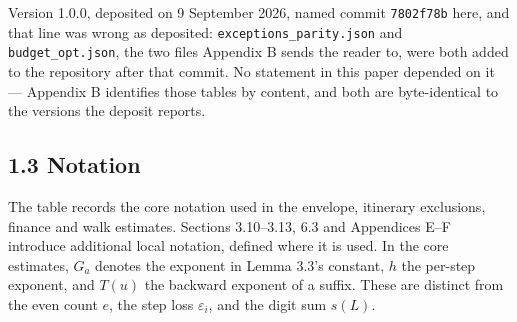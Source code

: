 \documentclass[12pt]{article}
\begin{document}
Version 1.0.0, deposited on 9 September 2026, named commit
\texttt{\nolinkurl{7802f78b}} here, and that line was wrong as
deposited: \texttt{\nolinkurl{exceptions_parity.json}} and
\texttt{\nolinkurl{budget_opt.json}}, the two files Appendix B sends the
reader to, were both added to the repository after that commit. No
statement in this paper depended on it --- Appendix B identifies those
tables by content, and both are byte-identical to the versions the
deposit reports.

\subsection{1.3 Notation}\label{notation}

The table records the core notation used in the envelope, itinerary
exclusions, finance and walk estimates. Sections 3.10--3.13, 6.3 and
Appendices E--F introduce additional local notation, defined where it is
used. In the core estimates, \(G_a\) denotes the exponent in Lemma 3.3's
constant, \(h\) the per-step exponent, and \(T(u)\) the backward
exponent of a suffix. These are distinct from the even count \(e\), the
step loss \(\varepsilon_i\), and the digit sum \(s(L)\).

\begingroup\small
\end{document}
